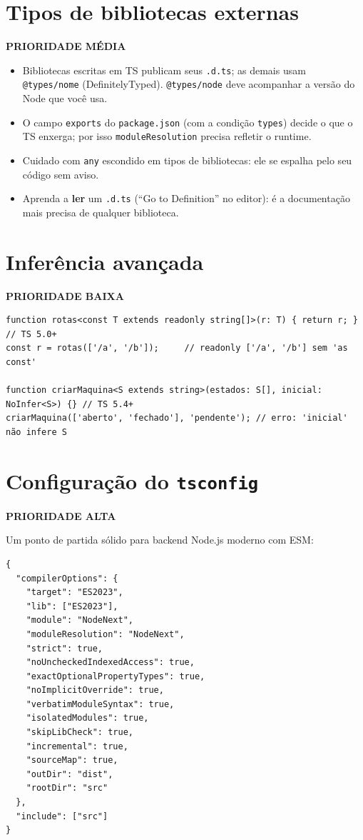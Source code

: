 \documentclass[12pt,a4paper,oneside]{book}
\newcommand{\alta}{\colorbox{red!15}{\sffamily\scriptsize\bfseries PRIORIDADE ALTA}}
\newcommand{\media}{\colorbox{orange!20}{\sffamily\scriptsize\bfseries PRIORIDADE MÉDIA}}
\newcommand{\baixa}{\colorbox{gray!20}{\sffamily\scriptsize\bfseries PRIORIDADE BAIXA}}
\newcommand{\code}[1]{\texttt{#1}}
\begin{document}
\section{Tipos de bibliotecas externas}
\media

\begin{itemize}
  \item Bibliotecas escritas em TS publicam seus \code{.d.ts}; as demais usam \code{@types/nome} (DefinitelyTyped). \code{@types/node} deve acompanhar a versão do Node que você usa.
  \item O campo \code{exports} do \code{package.json} (com a condição \code{types}) decide o que o TS enxerga; por isso \code{moduleResolution} precisa refletir o runtime.
  \item Cuidado com \code{any} escondido em tipos de bibliotecas: ele se espalha pelo seu código sem aviso.
  \item Aprenda a \textbf{ler} um \code{.d.ts} (``Go to Definition'' no editor): é a documentação mais precisa de qualquer biblioteca.
\end{itemize}

\section{Inferência avançada}
\baixa

\begin{verbatim}
function rotas<const T extends readonly string[]>(r: T) { return r; }  // TS 5.0+
const r = rotas(['/a', '/b']);     // readonly ['/a', '/b'] sem 'as const'

function criarMaquina<S extends string>(estados: S[], inicial: NoInfer<S>) {} // TS 5.4+
criarMaquina(['aberto', 'fechado'], 'pendente'); // erro: 'inicial' não infere S
\end{verbatim}

\section{Configuração do \texttt{tsconfig}}
\label{sec:tsconfig}
\alta

Um ponto de partida sólido para backend Node.js moderno com ESM:

\begin{verbatim}
{
  "compilerOptions": {
    "target": "ES2023",
    "lib": ["ES2023"],
    "module": "NodeNext",
    "moduleResolution": "NodeNext",
    "strict": true,
    "noUncheckedIndexedAccess": true,
    "exactOptionalPropertyTypes": true,
    "noImplicitOverride": true,
    "verbatimModuleSyntax": true,
    "isolatedModules": true,
    "skipLibCheck": true,
    "incremental": true,
    "sourceMap": true,
    "outDir": "dist",
    "rootDir": "src"
  },
  "include": ["src"]
}
\end{verbatim}
\end{document}
